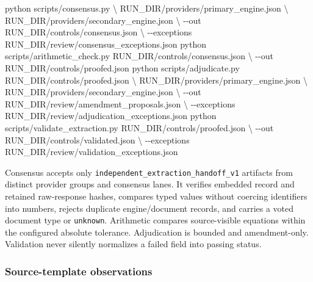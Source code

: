 \documentclass[
]{article}
\newenvironment{Shaded}{}{}
\newcommand{\AttributeTok}[1]{\textcolor[rgb]{0.49,0.56,0.16}{#1}}
\newcommand{\DataTypeTok}[1]{\textcolor[rgb]{0.56,0.13,0.00}{#1}}
\newcommand{\ExtensionTok}[1]{#1}
\newcommand{\NormalTok}[1]{#1}
\begin{document}
\begin{Shaded}
\begin{Highlighting}[]
\ExtensionTok{python}\NormalTok{ scripts/consensus.py }\DataTypeTok{\textbackslash{}}
\NormalTok{  RUN\_DIR/providers/primary\_engine.json }\DataTypeTok{\textbackslash{}}
\NormalTok{  RUN\_DIR/providers/secondary\_engine.json }\DataTypeTok{\textbackslash{}}
  \AttributeTok{{-}{-}out}\NormalTok{ RUN\_DIR/controls/consensus.json }\DataTypeTok{\textbackslash{}}
  \AttributeTok{{-}{-}exceptions}\NormalTok{ RUN\_DIR/review/consensus\_exceptions.json}
\ExtensionTok{python}\NormalTok{ scripts/arithmetic\_check.py RUN\_DIR/controls/consensus.json }\DataTypeTok{\textbackslash{}}
  \AttributeTok{{-}{-}out}\NormalTok{ RUN\_DIR/controls/proofed.json}
\ExtensionTok{python}\NormalTok{ scripts/adjudicate.py RUN\_DIR/controls/proofed.json }\DataTypeTok{\textbackslash{}}
\NormalTok{  RUN\_DIR/providers/primary\_engine.json }\DataTypeTok{\textbackslash{}}
\NormalTok{  RUN\_DIR/providers/secondary\_engine.json }\DataTypeTok{\textbackslash{}}
  \AttributeTok{{-}{-}out}\NormalTok{ RUN\_DIR/review/amendment\_proposals.json }\DataTypeTok{\textbackslash{}}
  \AttributeTok{{-}{-}exceptions}\NormalTok{ RUN\_DIR/review/adjudication\_exceptions.json}
\ExtensionTok{python}\NormalTok{ scripts/validate\_extraction.py RUN\_DIR/controls/proofed.json }\DataTypeTok{\textbackslash{}}
  \AttributeTok{{-}{-}out}\NormalTok{ RUN\_DIR/controls/validated.json }\DataTypeTok{\textbackslash{}}
  \AttributeTok{{-}{-}exceptions}\NormalTok{ RUN\_DIR/review/validation\_exceptions.json}
\end{Highlighting}
\end{Shaded}

Consensus accepts only
\texttt{independent\_\allowbreak{}extraction\_\allowbreak{}handoff\_\allowbreak{}v1}
artifacts from distinct provider groups and consensus lanes. It verifies
embedded record and retained raw-response hashes, compares typed values
without coercing identifiers into numbers, rejects duplicate
engine/document records, and carries a voted document type or
\texttt{unknown}. Arithmetic compares source-visible equations within
the configured absolute tolerance. Adjudication is bounded and
amendment-only. Validation never silently normalizes a failed field into
passing status.

\subsubsection{Source-template
observations}\label{source-template-observations}
\end{document}
